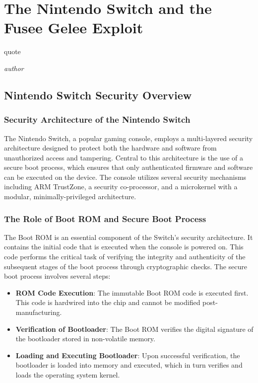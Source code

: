 \chapter{The Nintendo Switch and the Fusee Gelee Exploit}
\epigraph{quote}{\textit{author}}

\section{Nintendo Switch Security Overview}

\subsection{Security Architecture of the Nintendo Switch}

The Nintendo Switch, a popular gaming console, employs a multi-layered security architecture designed to protect both the hardware and software from unauthorized access and tampering. Central to this architecture is the use of a secure boot process, which ensures that only authenticated firmware and software can be executed on the device. The console utilizes several security mechanisms including ARM TrustZone, a security co-processor, and a microkernel with a modular, minimally-privileged architecture.

\subsection{The Role of Boot ROM and Secure Boot Process}

The Boot ROM is an essential component of the Switch's security architecture. It contains the initial code that is executed when the console is powered on. This code performs the critical task of verifying the integrity and authenticity of the subsequent stages of the boot process through cryptographic checks. The secure boot process involves several steps:

\begin{itemize}
    \item \textbf{ROM Code Execution}: The immutable Boot ROM code is executed first. This code is hardwired into the chip and cannot be modified post-manufacturing.
    \item \textbf{Verification of Bootloader}: The Boot ROM verifies the digital signature of the bootloader stored in non-volatile memory.
    \item \textbf{Loading and Executing Bootloader}: Upon successful verification, the bootloader is loaded into memory and executed, which in turn verifies and loads the operating system kernel.
\end{itemize}

